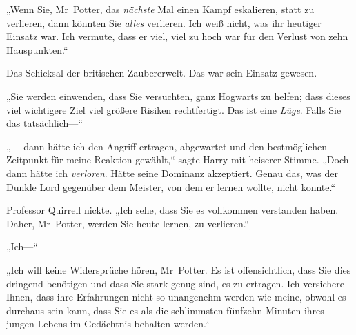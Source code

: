 „Wenn Sie, Mr~Potter, das \emph{nächste} Mal einen Kampf eskalieren, statt zu verlieren, dann könnten Sie \emph{alles} verlieren. Ich weiß nicht, was ihr heutiger Einsatz war. Ich vermute, dass er viel, viel zu hoch war für den Verlust von zehn Hauspunkten.“

Das Schicksal der britischen Zaubererwelt. Das war sein Einsatz gewesen.

„Sie werden einwenden, dass Sie versuchten, ganz Hogwarts zu helfen; dass dieses viel wichtigere Ziel viel größere Risiken rechtfertigt. Das ist eine \emph{Lüge}. Falls Sie das tatsächlich—“

„— dann hätte ich den Angriff ertragen, abgewartet und den bestmöglichen Zeitpunkt für meine Reaktion gewählt,“ sagte Harry mit heiserer Stimme. „Doch dann hätte ich \emph{verloren}. Hätte seine Dominanz akzeptiert. Genau das, was der Dunkle Lord gegenüber dem Meister, von dem er lernen wollte, nicht konnte.“

Professor Quirrell nickte. „Ich sehe, dass Sie es vollkommen verstanden haben. Daher, Mr~Potter, werden Sie heute lernen, zu verlieren.“

„Ich—“

„Ich will keine Widersprüche hören, Mr~Potter. Es ist offensichtlich, dass Sie dies dringend benötigen und dass Sie stark genug sind, es zu ertragen. Ich versichere Ihnen, dass ihre Erfahrungen nicht so unangenehm werden wie meine, obwohl es durchaus sein kann, dass Sie es als die schlimmsten fünfzehn Minuten ihres jungen Lebens im Gedächtnis behalten werden.“

